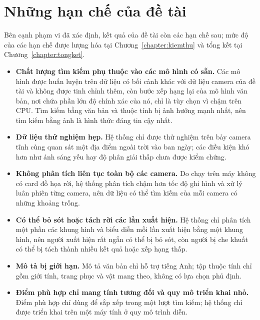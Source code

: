 \section{Những hạn chế của đề tài}
\label{sec:1.4}

Bên cạnh phạm vi đã xác định, kết quả của đề tài còn các hạn chế sau; mức độ của các hạn chế được lượng hóa tại Chương~\ref{chapter:kiemthu} và tổng kết tại Chương~\ref{chapter:tongket}.
\begin{itemize}
    \item \textbf{Chất lượng tìm kiếm phụ thuộc vào các mô hình có sẵn.} Các mô hình được huấn luyện trên dữ liệu có bối cảnh khác với dữ liệu camera của đề tài và không được tinh chỉnh thêm, còn bước xếp hạng lại của mô hình văn bản, nơi chứa phần lớn độ chính xác của nó, chỉ là tùy chọn vì chậm trên CPU. Tìm kiếm bằng văn bản và thuộc tính bị ảnh hưởng mạnh nhất, nên tìm kiếm bằng ảnh là hình thức đáng tin cậy nhất.
    \item \textbf{Dữ liệu thử nghiệm hẹp.} Hệ thống chỉ được thử nghiệm trên bảy camera tĩnh cùng quan sát một địa điểm ngoài trời vào ban ngày; các điều kiện khó hơn như ánh sáng yếu hay độ phân giải thấp chưa được kiểm chứng.
    \item \textbf{Không phân tích liên tục toàn bộ các camera.} Do chạy trên máy không có card đồ họa rời, hệ thống phân tích chậm hơn tốc độ ghi hình và xử lý luân phiên từng camera, nên dữ liệu có thể tìm kiếm của mỗi camera có những khoảng trống.
    \item \textbf{Có thể bỏ sót hoặc tách rời các lần xuất hiện.} Hệ thống chỉ phân tích một phần các khung hình và biểu diễn mỗi lần xuất hiện bằng một khung hình, nên người xuất hiện rất ngắn có thể bị bỏ sót, còn người bị che khuất có thể bị tách thành nhiều kết quả hoặc xếp hạng thấp.
    \item \textbf{Mô tả bị giới hạn.} Mô tả văn bản chỉ hỗ trợ tiếng Anh; tập thuộc tính chỉ gồm giới tính, trang phục và vật mang theo, không có lựa chọn phủ định.
    \item \textbf{Điểm phù hợp chỉ mang tính tương đối và quy mô triển khai nhỏ.} Điểm phù hợp chỉ dùng để sắp xếp trong một lượt tìm kiếm; hệ thống chỉ được triển khai trên một máy tính ở quy mô trình diễn.
\end{itemize}
